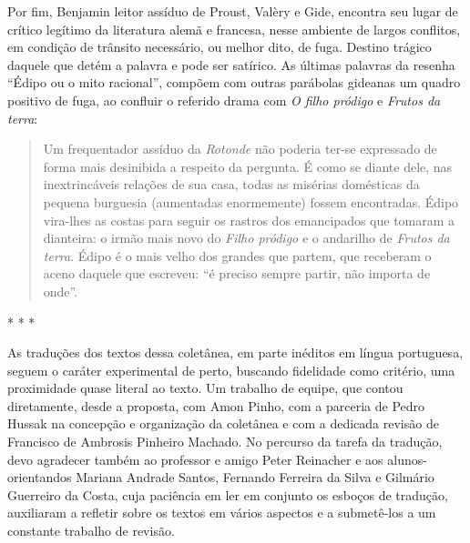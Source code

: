 Por fim, Benjamin leitor assíduo de Proust, Valèry e Gide, encontra seu
lugar de crítico legítimo da literatura alemã e francesa, nesse ambiente
de largos conflitos, em condição de trânsito necessário, ou melhor dito,
de fuga. Destino trágico daquele que detém a palavra e pode ser
satírico. As últimas palavras da resenha ``Édipo ou o mito racional'',
compõem com outras parábolas gideanas um quadro positivo de fuga, ao
confluir o referido drama com \emph{O filho pródigo} e \emph{Frutos da
terra}:

\begin{quote}
Um frequentador assíduo da \emph{Rotonde} não poderia ter-se expressado
de forma mais desinibida a respeito da pergunta. É como se diante dele,
nas inextrincáveis relações de sua casa, todas as misérias domésticas da
pequena burguesia (aumentadas enormemente) fossem encontradas. Édipo
vira-lhes as costas para seguir os rastros dos emancipados que tomaram a
dianteira: o irmão mais novo do \emph{Filho pródigo} e o andarilho de
\emph{Frutos da terra}. Édipo é o mais velho dos grandes que partem, que
receberam o aceno daquele que escreveu: ``é preciso sempre partir, não
importa de onde''.
\end{quote}

* * *

As traduções dos textos dessa coletânea, em parte inéditos em língua
portuguesa, seguem o caráter experimental de perto, buscando fidelidade
como critério, uma proximidade quase literal ao texto. Um trabalho de
equipe, que contou diretamente, desde a proposta, com Amon Pinho, com a
parceria de Pedro Hussak na concepção e organização da coletânea e com a
dedicada revisão de Francisco de Ambrosis Pinheiro Machado. No percurso
da tarefa da tradução, devo agradecer também ao professor e amigo Peter
Reinacher e aos alunos-orientandos Mariana Andrade Santos, Fernando
Ferreira da Silva e Gilmário Guerreiro da Costa, cuja paciência em ler
em conjunto os esboços de tradução, auxiliaram a refletir sobre os
textos em vários aspectos e a submetê-los a um constante trabalho de
revisão.
